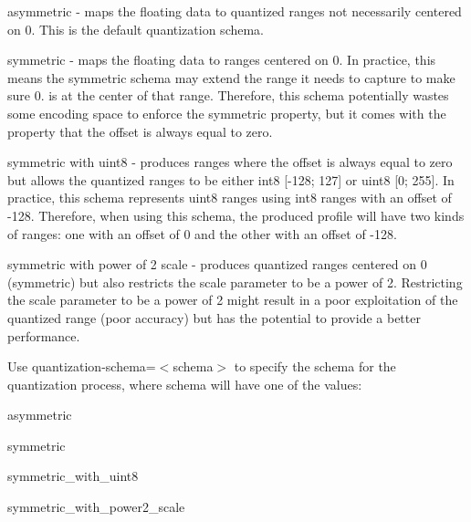 \begin{DoxyItemize}
\item {\ttfamily asymmetric} -\/ maps the floating data to quantized ranges not necessarily centered on 0. This is the default quantization schema.
\item {\ttfamily symmetric} -\/ maps the floating data to ranges centered on 0. In practice, this means the symmetric schema may extend the range it needs to capture to make sure 0. is at the center of that range. Therefore, this schema potentially wastes some encoding space to enforce the symmetric property, but it comes with the property that the offset is always equal to zero.
\item {\ttfamily symmetric with uint8} -\/ produces ranges where the offset is always equal to zero but allows the quantized ranges to be either int8 \mbox{[}-\/128; 127\mbox{]} or uint8 \mbox{[}0; 255\mbox{]}. In practice, this schema represents uint8 ranges using int8 ranges with an offset of -\/128. Therefore, when using this schema, the produced profile will have two kinds of ranges\+: one with an offset of 0 and the other with an offset of -\/128.
\item {\ttfamily symmetric with power of 2 scale} -\/ produces quantized ranges centered on 0 (symmetric) but also restricts the scale parameter to be a power of 2. Restricting the scale parameter to be a power of 2 might result in a poor exploitation of the quantized range (poor accuracy) but has the potential to provide a better performance.
\end{DoxyItemize}

Use {\ttfamily quantization-\/schema=$<$schema$>$} to specify the schema for the quantization process, where schema will have one of the values\+:


\begin{DoxyItemize}
\item {\ttfamily asymmetric}
\item {\ttfamily symmetric}
\item {\ttfamily symmetric\+\_\+with\+\_\+uint8}
\item {\ttfamily symmetric\+\_\+with\+\_\+power2\+\_\+scale}
\end{DoxyItemize}


